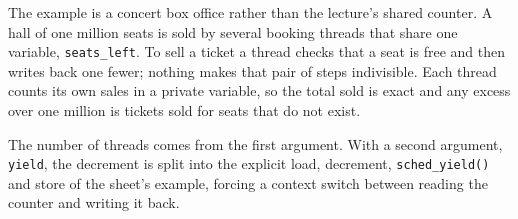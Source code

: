 
The example is a concert box office rather than the lecture's shared counter.
A hall of one million seats is sold by several booking threads that share one
variable, \texttt{seats\_left}. To sell a ticket a thread checks that a seat is
free and then writes back one fewer; nothing makes that pair of steps
indivisible. Each thread counts its own sales in a private variable, so the
total sold is exact and any excess over one million is tickets sold for seats
that do not exist.

The number of threads comes from the first argument. With a second argument,
\texttt{yield}, the decrement is split into the explicit load, decrement,
\texttt{sched\_yield()} and store of the sheet's example, forcing a context
switch between reading the counter and writing it back.
